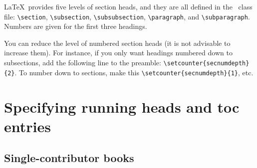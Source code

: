 \LaTeX\ provides five levels of section heads, and they are all defined in the \cambridge\ class file: \verb"\section", \verb"\subsection", \verb"\subsubsection", \verb"\paragraph", and \verb"\subparagraph". Numbers are given for the first three headings.

You can reduce the level of numbered section heads (it is not advisable to increase them). For instance, if you only want headings numbered down to subsections, add the following line to the preamble: \verb"\setcounter{secnumdepth}{2}". To number down to sections, make this \verb"\setcounter{secnumdepth}{1}", etc.


\section{Specifying running heads and toc entries}

\subsection{Single-contributor books}
\label{singlecontributor}

